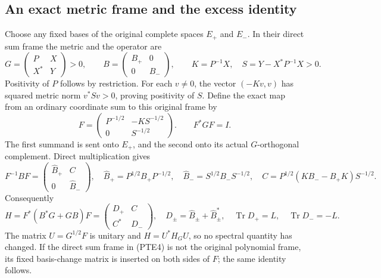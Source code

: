 \subsection{An exact metric frame and the excess identity}

Choose any fixed bases of the original complete spaces \(E_+\) and
\(E_-\).  In their direct sum frame the metric and the operator are
\begin{equation}\tag{PTE4}\label{eq:pte4}
 G=\begin{pmatrix}P&X\\X^*&Y\end{pmatrix}>0,
 \qquad B=\begin{pmatrix}B_+&0\\0&B_-\end{pmatrix},
 \qquad K=P^{-1}X,
 \quad S=Y-X^*P^{-1}X>0.
\end{equation}
Positivity of \(P\) follows by restriction.  For each \(v\ne0\), the
vector \((-Kv,v)\) has squared metric norm \(v^*Sv>0\), proving
positivity of \(S\).  Define the exact map from an ordinary coordinate
sum to this original frame by
\begin{equation}\tag{PTE5}\label{eq:pte5}
 F=\begin{pmatrix}P^{-1/2}&-KS^{-1/2}\\0&S^{-1/2}\end{pmatrix}.
 \qquad F^*GF=I.
\end{equation}
The first summand is sent onto \(E_+\), and the second onto its actual
\(G\)-orthogonal complement.  Direct multiplication gives
\begin{equation}\tag{PTE6}\label{eq:pte6}
 F^{-1}BF=
 \begin{pmatrix}\widehat B_+&C\\0&\widehat B_-\end{pmatrix},
 \quad \widehat B_+=P^{1/2}B_+P^{-1/2},
 \quad \widehat B_-=S^{1/2}B_-S^{-1/2},
 \quad C=P^{1/2}(KB_--B_+K)S^{-1/2}.
\end{equation}
Consequently
\begin{equation}\tag{PTE7}\label{eq:pte7}
 H=F^*(B^*G+GB)F
 =\begin{pmatrix}D_+&C\\C^*&D_-\end{pmatrix},
 \quad D_\pm=\widehat B_\pm+\widehat B_\pm^*,
 \quad \operatorname{Tr}D_+=L,\quad \operatorname{Tr}D_-=-L.
\end{equation}
The matrix \(U=G^{1/2}F\) is unitary and \(H=U^*H_GU\), so no spectral
quantity has changed.  If the direct sum frame in (PTE4) is not the
original polynomial frame, its fixed basis-change matrix is inserted
on both sides of \(F\); the same identity follows.

